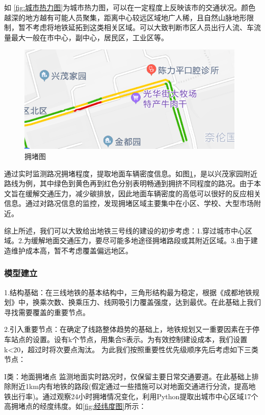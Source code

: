 \documentclass[12pt,a4paper]{mcmthesis}
\begin{document}
    如 \ref{fig:城市热力图}为城市热力图，可以在一定程度上反映该市的交通状况。颜色越深的地方越有可能人员聚集，距离中心较远区域地广人稀，且自然山脉地形限制，暂不考虑将地铁延拓到这类相关区域。可以大致判断市区人员出行人流、车流量最大一般在市中心，副中心，居民区，工业区等。
    \begin{figure}[h!t]
        \centerline{\includegraphics[scale=1]{figures/拥堵图}\quad
        }
        \caption{\song\wuhao
        拥堵图}
        \label{fig:拥堵图}
    \end{figure}


    通过实时监测路况拥堵程度，提取地面车辆密度信息。如图\ref{fig:拥堵图}，是以兴茂家园附近路线为例，其中绿色到黄色再到红色分别表明畅通到拥挤不同程度的路况。由于本文旨在缓解交通压力，减少碳排放，因此地面车辆密度的高低可以很好的反应相关信息。通过对路况信息的监控，发现拥堵区域主要集中在小区、学校、大型市场附近。

    综上所述，我们可以大致给出地铁三号线的建设的初步考虑：1.穿过城市中心区域。2.为缓解地面交通压力，要尽可能多地途径拥堵路段或其附近区域。3.由于建造维护成本高，暂不考虑覆盖偏远地区。

    \subsubsection{模型建立}
    1.结构基础：在三线地铁的基本结构中，三角形结构最为稳定，根据《成都地铁规划》中，换乘次数、换乘压力、线网吸引力覆盖强度，达到最优。在此基础上我们寻找需要覆盖的重要节点。

    2.引入重要节点：在确定了线路整体趋势的基础上，地铁规划又一重要因素在于停车站点的设置。设有k个节点，用集合S表示。为有效控制建设成本，我们设置k<20，超过时将次要点淘汰。
    为此我们按照重要性优先级顺序先后考虑如下三类节点：

    I类：地面拥堵点
    监测地面实时路况时，仅保留主要日常交通要道。在此基础上排除附近1km内有地铁的路段(假定通过一些措施可以对地面交通进行分流，提高地铁出行率)。通过观察24小时拥堵情况变化，利用Python提取出城市中心区域17个高拥堵点的经度纬度。如\ref{fig:经纬度图}所示：
\end{document}
